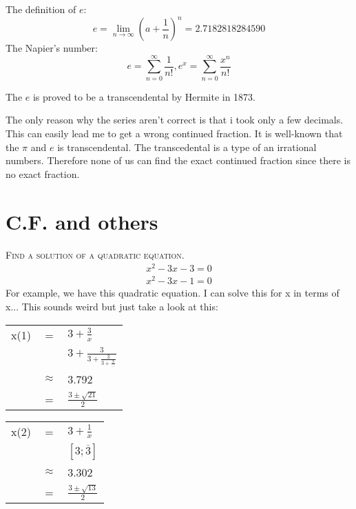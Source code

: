 \documentclass{jreport}
\begin{document}
The definition of $e$:
\[e=\lim_{n\rightarrow \infty}(a+\frac{1}{n})^n=2.7182818284590\]
The Napier's number:
\[e=\sum_{n=0}^{\infty}\frac{1}{n!},e^x=\sum_{n=0}^{\infty}\frac{x^n}{n!}\]

The $e$ is proved to be a transcendental by Hermite in 1873.

\begin{center}
\begin{minipage}{10cm}
The only reason why the series aren't correct is that i took only a few decimals. This can easily lead me to get a wrong continued fraction. It is well-known that the $\pi$ and $e$ is transcendental. The transcedental is a type of an irrational numbers. Therefore none of us can find the exact continued fraction since there is no exact fraction.
\end{minipage}
\end{center}

\section*{C.F. and others}
\textsc{Find a solution of a quadratic equation.}
\begin{eqnarray}
x^2-3x-3=0
\end{eqnarray}
\begin{eqnarray}
x^2-3x-1=0
\end{eqnarray}
For example, we have this quadratic equation. I can solve this for x in terms of x... This sounds weird but just take a look at this:
\begin{table}[htbp]
\begin{center}
\begin{tabular}{|lcl|}
\hline
x(1) & = & $3+\frac{3}{x}$\\
     &   & $3+\frac{3}{3+\frac{3}{3+\frac{3}{...}}}$\\
     & $\approx$ & 3.792\\
     & = & $\frac{3\pm \sqrt{21}}{2}$\\
\hline
\end{tabular}
\begin{tabular}{|lcl|}
\hline
x(2) & = & $3+\frac{1}{x}$\\
     &   & $[3;\overline{3} ]$\\
     & $\approx$ & 3.302\\
     & = & $\frac{3\pm \sqrt{13}}{2}$\\
\hline
\end{tabular}
\end{center}
\end{table}
\end{document}

